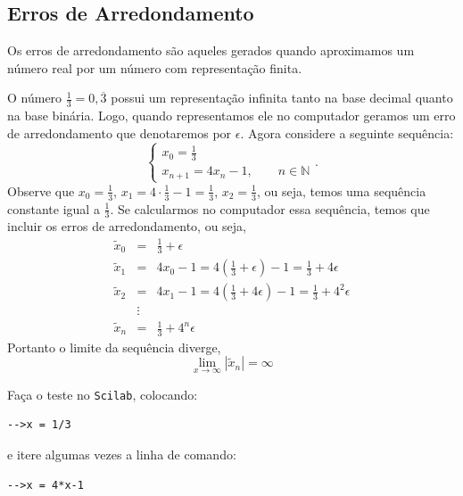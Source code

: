\documentclass[main.tex]{subfiles}
\begin{document}
\subsection{Erros de Arredondamento}{\label{arredondamento_sec}}
Os erros de arredondamento são aqueles gerados quando aproximamos um número real por um número com representação finita.

\begin{ex}
O número $\frac{1}{3}=0,\overline{3}$ possui um representação infinita tanto na base decimal quanto na base binária. Logo, quando representamos ele no computador geramos um erro de arredondamento que denotaremos por $\epsilon$. Agora considere a seguinte sequência:
$$
\left\{\begin{array}{l}
x_0=\frac{1}{3}\\
x_{n+1}=4x_n-1,\qquad n\in\mathbb{N}
\end{array}\right..
$$
Observe que $x_0=\frac{1}{3}$, $x_1=4\cdot \frac{1}{3}-1=\frac{1}{3}$, $x_2=\frac{1}{3}$, ou seja, temos uma sequência constante igual a $\frac{1}{3}$. Se calcularmos no computador essa sequência, temos que incluir os erros de arredondamento, ou seja,
\begin{eqnarray*}
\tilde{x}_0&=&\frac{1}{3}+\epsilon\\
\tilde{x}_1&=&4x_0-1=4\left(\frac{1}{3}+\epsilon\right)-1=\frac{1}{3}+4\epsilon\\
\tilde{x}_2&=&4x_1-1=4\left(\frac{1}{3}+4\epsilon\right)-1=\frac{1}{3}+4^2\epsilon\\
&\vdots&\\
\tilde{x}_n&=&\frac{1}{3}+4^n\epsilon
\end{eqnarray*}
Portanto o limite da sequência diverge,
\begin{equation*}
\lim_{x\to\infty}|\tilde{x}_n|=\infty  
\end{equation*}

\ifisscilab
Faça o teste no \verb+Scilab+, colocando:
\begin{verbatim}
-->x = 1/3
\end{verbatim}
e itere algumas vezes a linha de comando:
\begin{verbatim}
-->x = 4*x-1
\end{verbatim}
\fi
\end{ex}
\end{document}
